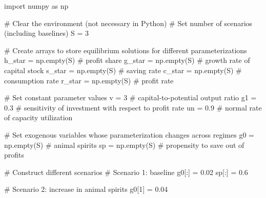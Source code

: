 \documentclass[
  letterpaper,
  DIV=11,
  numbers=noendperiod]{scrreprt}
\newenvironment{Shaded}{\begin{snugshade}}{\end{snugshade}}
\newcommand{\CommentTok}[1]{\textcolor[rgb]{0.37,0.37,0.37}{#1}}
\newcommand{\DecValTok}[1]{\textcolor[rgb]{0.68,0.00,0.00}{#1}}
\newcommand{\FloatTok}[1]{\textcolor[rgb]{0.68,0.00,0.00}{#1}}
\newcommand{\ImportTok}[1]{\textcolor[rgb]{0.00,0.46,0.62}{#1}}
\newcommand{\NormalTok}[1]{\textcolor[rgb]{0.00,0.23,0.31}{#1}}
\newcommand{\OperatorTok}[1]{\textcolor[rgb]{0.37,0.37,0.37}{#1}}
\begin{document}
\begin{tcolorbox}[enhanced jigsaw, titlerule=0mm, breakable, bottomrule=.15mm, toprule=.15mm, colbacktitle=quarto-callout-note-color!10!white, rightrule=.15mm, toptitle=1mm, opacityback=0, left=2mm, coltitle=black, title=\textcolor{quarto-callout-note-color}{\faInfo}\hspace{0.5em}{Python code}, colframe=quarto-callout-note-color-frame, opacitybacktitle=0.6, leftrule=.75mm, bottomtitle=1mm, arc=.35mm, colback=white]

\begin{Shaded}
\begin{Highlighting}[]
\ImportTok{import}\NormalTok{ numpy }\ImportTok{as}\NormalTok{ np}

\CommentTok{\# Clear the environment (not necessary in Python)}
\CommentTok{\# Set number of scenarios (including baselines)}
\NormalTok{S }\OperatorTok{=} \DecValTok{3}

\CommentTok{\# Create arrays to store equilibrium solutions for different parameterizations}
\NormalTok{h\_star }\OperatorTok{=}\NormalTok{ np.empty(S)  }\CommentTok{\# profit share}
\NormalTok{g\_star }\OperatorTok{=}\NormalTok{ np.empty(S)  }\CommentTok{\# growth rate of capital stock}
\NormalTok{s\_star }\OperatorTok{=}\NormalTok{ np.empty(S)  }\CommentTok{\# saving rate}
\NormalTok{c\_star }\OperatorTok{=}\NormalTok{ np.empty(S)  }\CommentTok{\# consumption rate}
\NormalTok{r\_star }\OperatorTok{=}\NormalTok{ np.empty(S)  }\CommentTok{\# profit rate}

\CommentTok{\# Set constant parameter values}
\NormalTok{v }\OperatorTok{=} \DecValTok{3}    \CommentTok{\# capital{-}to{-}potential output ratio}
\NormalTok{g1 }\OperatorTok{=} \FloatTok{0.3}  \CommentTok{\# sensitivity of investment with respect to profit rate }
\NormalTok{un }\OperatorTok{=} \FloatTok{0.9}  \CommentTok{\# normal rate of capacity utilization}

\CommentTok{\# Set exogenous variables whose parameterization changes across regimes}
\NormalTok{g0 }\OperatorTok{=}\NormalTok{ np.empty(S)  }\CommentTok{\# animal spirits}
\NormalTok{sp }\OperatorTok{=}\NormalTok{ np.empty(S)  }\CommentTok{\# propensity to save out of profits}

\CommentTok{\# Construct different scenarios}
\CommentTok{\# Scenario 1: baseline}
\NormalTok{g0[:] }\OperatorTok{=} \FloatTok{0.02}
\NormalTok{sp[:] }\OperatorTok{=} \FloatTok{0.6}

\CommentTok{\# Scenario 2: increase in animal spirits}
\NormalTok{g0[}\DecValTok{1}\NormalTok{] }\OperatorTok{=} \FloatTok{0.04}


\end{Highlighting}
\end{Shaded}
\end{tcolorbox}
\end{document}
